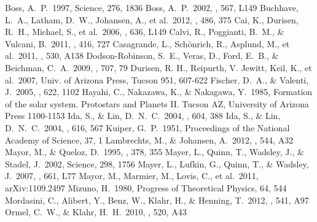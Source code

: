 \documentclass[twocolumn, dvipdfmx]{aastex62}
\begin{document}
\begin{CJK*}{UTF8}{min}
\vspace{5mm}


\begin{thebibliography}{}

 Boss, A.~P.\ 1997, Science, 276, 1836
 Boss, A.~P.\ 2002, \apjl, 567, L149
 Buchhave, L.~A., Latham, D.~W., Johansen, A., et al.\ 2012, \nat, 486, 375
 Cai, K., Durisen, R.~H., Michael, S., et al.\ 2006, \apjl, 636, L149
 Calvi, R., Poggianti, B.~M., \& Vulcani, B.\ 2011, \mnras, 416, 727
 Casagrande, L., Sch{\"o}nrich, R., Asplund, M., et al.\ 2011, \aap, 530, A138
 Dodson-Robinson, S.~E., Veras, D., Ford, E.~B., \& Beichman, C.~A.\ 2009, \apj, 707, 79
 Durisen, R. H., Reipurth, V. Jewitt, Keil, K., et al.\ 2007, Univ. of Arizona Press, Tucson 951, 607-622
 Fischer, D.~A., \& Valenti, J.\ 2005, \apj, 622, 1102
 Hayahi, C., Nakazawa, K., \& Nakagawa, Y.\ 1985, Formation of the solar system. Protostars and Planets II. Tucson AZ, University of Arizona Press 1100-1153
 Ida, S., \& Lin, D.~N.~C.\ 2004, \apj, 604, 388
 Ida, S., \& Lin, D.~N.~C.\ 2004, \apj, 616, 567
 Kuiper, G.~P.\ 1951, Proceedings of the National Academy of Science, 37, 1
 Lambrechts, M., \& Johansen, A.\ 2012, \aap, 544, A32
 Mayor, M., \& Queloz, D.\ 1995, \nat, 378, 355
 Mayer, L., Quinn, T., Wadsley, J., \& Stadel, J.\ 2002, Science, 298, 1756
 Mayer, L., Lufkin, G., Quinn, T., \& Wadsley, J.\ 2007, \apjl, 661, L77
 Mayor, M., Marmier, M., Lovis, C., et al.\ 2011, arXiv:1109.2497
 Mizuno, H.\ 1980, Progress of Theoretical Physics, 64, 544
 Mordasini, C., Alibert, Y., Benz, W., Klahr, H., \& Henning, T.\ 2012, \aap, 541, A97
 Ormel, C.~W., \& Klahr, H.~H.\ 2010, \aap, 520, A43

\end{thebibliography}
\end{CJK*}
\end{document}
